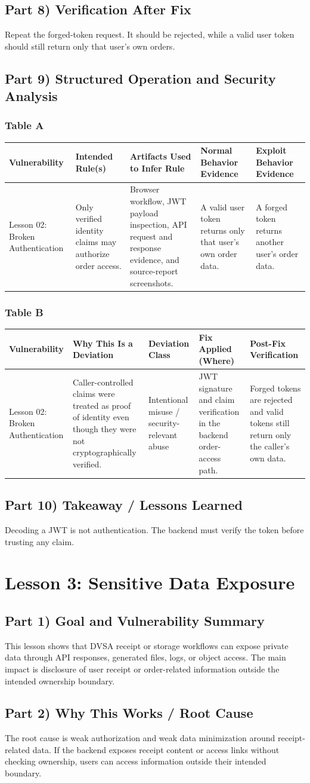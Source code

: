 \documentclass[12pt]{article}
\makeatletter
\newcommand{\analysistables}[9]{
\subsubsection*{Table A}
{\footnotesize
\begin{longtable}{@{}p{0.13\textwidth}p{0.18\textwidth}p{0.17\textwidth}p{0.16\textwidth}p{0.16\textwidth}@{}}
\toprule
Vulnerability & Intended Rule(s) & Artifacts Used to Infer Rule & Normal Behavior Evidence & Exploit Behavior Evidence \\
\midrule
#1 & #2 & #3 & #4 & #5 \\
\bottomrule
\end{longtable}
}

\subsubsection*{Table B}
{\footnotesize
\begin{longtable}{@{}p{0.13\textwidth}p{0.18\textwidth}p{0.13\textwidth}p{0.18\textwidth}p{0.16\textwidth}@{}}
\toprule
Vulnerability & Why This Is a Deviation & Deviation Class & Fix Applied (Where) & Post-Fix Verification \\
\midrule
#1 & #6 & #7 & #8 & #9 \\
\bottomrule
\end{longtable}
}
}
\makeatother
\begin{document}
\subsection*{Part 8) Verification After Fix}
Repeat the forged-token request. It should be rejected, while a valid user token should still return only that user's own orders.

\subsection*{Part 9) Structured Operation and Security Analysis}
\analysistables
{Lesson 02: Broken Authentication}
{Only verified identity claims may authorize order access.}
{Browser workflow, JWT payload inspection, API request and response evidence, and source-report screenshots.}
{A valid user token returns only that user's own order data.}
{A forged token returns another user's order data.}
{Caller-controlled claims were treated as proof of identity even though they were not cryptographically verified.}
{Intentional misuse / security-relevant abuse}
{JWT signature and claim verification in the backend order-access path.}
{Forged tokens are rejected and valid tokens still return only the caller's own data.}

\subsection*{Part 10) Takeaway / Lessons Learned}
Decoding a JWT is not authentication. The backend must verify the token before trusting any claim.

\clearpage
\section{Lesson 3: Sensitive Data Exposure}

\subsection*{Part 1) Goal and Vulnerability Summary}
This lesson shows that DVSA receipt or storage workflows can expose private data through API responses, generated files, logs, or object access. The main impact is disclosure of user receipt or order-related information outside the intended ownership boundary.

\subsection*{Part 2) Why This Works / Root Cause}
The root cause is weak authorization and weak data minimization around receipt-related data. If the backend exposes receipt content or access links without checking ownership, users can access information outside their intended boundary.
\end{document}
